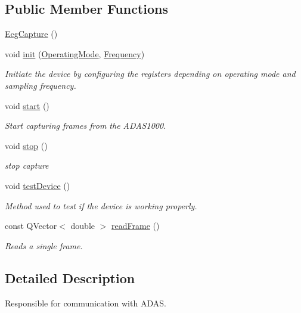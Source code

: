 \subsection*{Public Member Functions}
\begin{DoxyCompactItemize}
\item 
\hyperlink{group__Device-Facade_gaeef1c0708b94ee82330d6d165a2b5a71}{Ecg\+Capture} ()
\item 
void \hyperlink{group__Device-Facade_ga8f080b59e8caab0993bb7ee6b872b6a0}{init} (\hyperlink{group__Device-Facade_gabf6e5cc9109a573e29add762dc36df9b}{Operating\+Mode}, \hyperlink{group__Device-Facade_gaaf4f7677ca26944edc0f65195b8729f3}{Frequency})
\begin{DoxyCompactList}\small\item\em Initiate the device by configuring the registers depending on operating mode and sampling frequency. \end{DoxyCompactList}\item 
void \hyperlink{group__Device-Facade_ga9582047c81db34a3cab2bb315fcb1793}{start} ()
\begin{DoxyCompactList}\small\item\em Start capturing frames from the A\+D\+A\+S1000. \end{DoxyCompactList}\item 
void \hyperlink{group__Device-Facade_ga8fef74cdd0296256ab4a700dae2d02a4}{stop} ()
\begin{DoxyCompactList}\small\item\em stop capture \end{DoxyCompactList}\item 
void \hyperlink{group__Device-Facade_ga9f04dad928d472c92229f3f39a8f2445}{test\+Device} ()
\begin{DoxyCompactList}\small\item\em Method used to test if the device is working properly. \end{DoxyCompactList}\item 
const Q\+Vector$<$ double $>$ \hyperlink{group__Device-Facade_ga644ec3752de6ee1e818b5fcd1de5decd}{read\+Frame} ()
\begin{DoxyCompactList}\small\item\em Reads a single frame. \end{DoxyCompactList}\end{DoxyCompactItemize}


\subsection{Detailed Description}
Responsible for communication with A\+D\+AS. 


